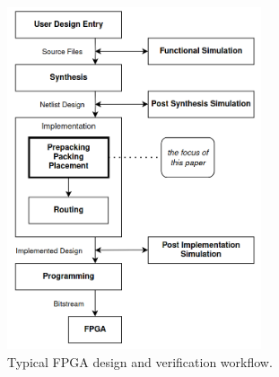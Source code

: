 \documentclass[twocolumn]{article}
\begin{document}
    \begin{figure}[]
    \centering
    \includegraphics[width=7.5cm]{figures/design_flow.png}
    \caption{Typical FPGA design and verification workflow.}
    \label{fig:design_flow}
    \end{figure}
\end{document}
